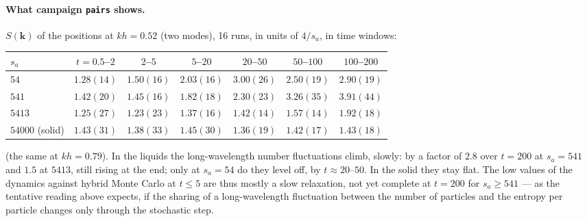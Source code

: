 \documentclass[11pt,aps,preprint,nofootinbib,superscriptaddress,tightenlines]{revtex4-2}
\let\oldparagraph\paragraph
\renewcommand{\paragraph}{\par\bigskip\oldparagraph}
\begin{document}
\paragraph{What campaign \texttt{pairs} shows.}  $S(\bm k)$ of the positions at $kh=0.52$ (two modes), 16 runs, in units of $4/s_a$, in time windows:
\begin{center}
\begin{tabular}{lcccccc}
\hline
$s_a$ & $t=0.5$--$2$ & $2$--$5$ & $5$--$20$ & $20$--$50$ & $50$--$100$ & $100$--$200$ \\ \hline
$54$ & $1.28(14)$ & $1.50(16)$ & $2.03(16)$ & $3.00(26)$ & $2.50(19)$ & $2.90(19)$ \\
$541$ & $1.42(20)$ & $1.45(16)$ & $1.82(18)$ & $2.30(23)$ & $3.26(35)$ & $3.91(44)$ \\
$5413$ & $1.25(27)$ & $1.23(23)$ & $1.37(16)$ & $1.42(14)$ & $1.57(14)$ & $1.92(18)$ \\
$54000$ (solid) & $1.43(31)$ & $1.38(33)$ & $1.45(30)$ & $1.36(19)$ & $1.42(17)$ & $1.43(18)$ \\
\hline
\end{tabular}
\end{center}
(the same at $kh=0.79$).  In the liquids the long-wavelength number fluctuations climb, slowly: by a factor of $2.8$ over
$t=200$ at $s_a=541$ and $1.5$ at $5413$, still rising at the end; only at $s_a=54$ do they level off, by $t\approx20$--$50$.  In the
solid they stay flat.  The low values of the dynamics against hybrid Monte Carlo at $t\le5$ are thus mostly a slow
relaxation, not yet complete at $t=200$ for $s_a\ge541$ --- as the tentative reading above expects, if the sharing of a
long-wavelength fluctuation between the number of particles and the entropy per particle changes only through the
stochastic step.
\end{document}
